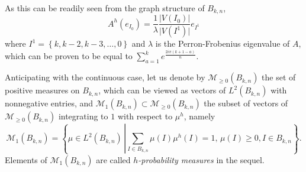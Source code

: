 \documentclass[10pt,11pt]{amsart}%
\begin{document}
As this can be readily seen from the graph structure of $B_{k,n}$,
$$A^h(e_{I_0})=\frac{1}{\lambda}\frac{\vert V(I_0)\vert}{\vert V(I^1)\vert}e_{I^1}$$
where $I^1=\left\{k,k-2,k-3,\ldots,0\right\}$ and $\lambda$ is the Perron-Frobenius eigenvalue of $A$, which can be proven to be equal to $\sum_{a=1}^ke^{\frac{2i\pi(k+1-a)}{n}}$.



Anticipating with the continuous case, let us denote by $\mathcal{M}_{\geq 0}(B_{k,n})$ the set of positive measures on $B_{k,n}$, which can be viewed as vectors of $L^2(B_{k,n})$ with nonnegative entries, and $\mathcal{M}_{1}(B_{k,n})\subset \mathcal{M}_{\geq 0}(B_{k,n})$ the subset of vectors of $\mathcal{M}_{\geq 0}(B_{k,n})$ integrating to $1$ with respect to $\mu^h$, namely
$$\mathcal{M}_{1}(B_{k,n})=\left\{\mu\in L^2(B_{k,n})\,\left\vert \sum_{I\in B_{k,n}} \mu(I)\mu^h(I)=1, \, \mu(I)\geq 0, I\in B_{k,n}\right.\right\}.$$
Elements of $\mathcal{M}_1(B_{k,n})$ are called \textit{$h$-probability measures} in the sequel.
\end{document}
